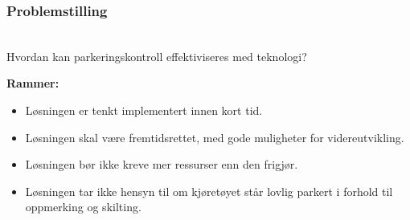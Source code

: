 \documentclass[xetex]{beamer}
\begin{document}
\begin{frame}\label{fr:problemstilling}
	\frametitle{Problemstilling}

	\\ [-10.5em]
	Hvordan kan parkeringskontroll \alert{effektiviseres} med teknologi?
	
	\textbf{Rammer:}
	\begin{itemize}
		\item Løsningen er tenkt implementert innen \alert{kort tid}.
		\item Løsningen skal være \alert{fremtidsrettet}, med gode muligheter for \alert{videreutvikling}.
		\item Løsningen bør ikke kreve mer \alert{ressurser} enn den frigjør.
		\item Løsningen tar ikke hensyn til om kjøretøyet står lovlig parkert i forhold til oppmerking og skilting.
	\end{itemize}
\end{frame}
\end{document}
